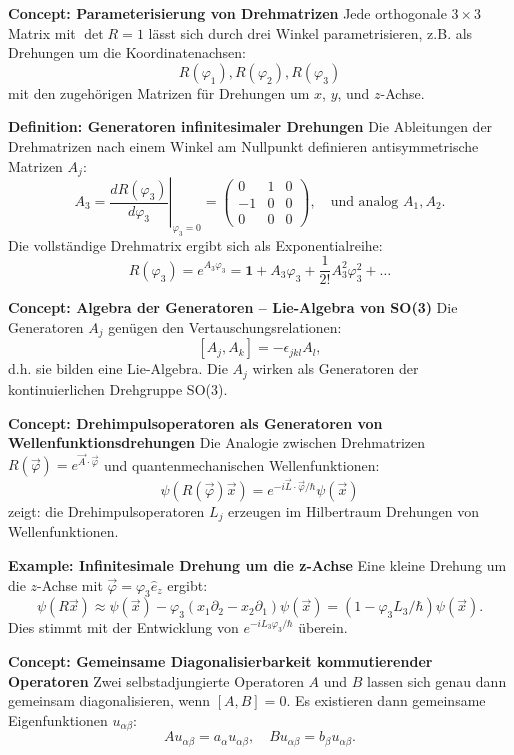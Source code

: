 \documentclass[10pt, letterpaper]{article}
\begin{document}
\textbf{Concept: Parameterisierung von Drehmatrizen}  
Jede orthogonale $3\times3$ Matrix mit $\det R = 1$ lässt sich durch drei Winkel parametrisieren, z.B. als Drehungen um die Koordinatenachsen:
$$
R(\varphi_1), R(\varphi_2), R(\varphi_3)
$$
mit den zugehörigen Matrizen für Drehungen um $x$, $y$, und $z$-Achse.



\textbf{Definition: Generatoren infinitesimaler Drehungen}  
Die Ableitungen der Drehmatrizen nach einem Winkel am Nullpunkt definieren antisymmetrische Matrizen $A_j$:
$$
A_3 = \left.\frac{dR(\varphi_3)}{d\varphi_3}\right|_{\varphi_3=0} =
\begin{pmatrix}
0 & 1 & 0 \\
-1 & 0 & 0 \\
0 & 0 & 0
\end{pmatrix}, \quad \text{und analog } A_1, A_2.
$$
Die vollständige Drehmatrix ergibt sich als Exponentialreihe:
$$
R(\varphi_3) = e^{A_3 \varphi_3} = \mathbf{1} + A_3 \varphi_3 + \frac{1}{2!} A_3^2 \varphi_3^2 + \dots
$$



\textbf{Concept: Algebra der Generatoren – Lie-Algebra von SO(3)}  
Die Generatoren $A_j$ genügen den Vertauschungsrelationen:
$$
[A_j, A_k] = -\epsilon_{jkl} A_l,
$$
d.h. sie bilden eine Lie-Algebra. Die $A_j$ wirken als Generatoren der kontinuierlichen Drehgruppe SO(3).


\textbf{Concept: Drehimpulsoperatoren als Generatoren von Wellenfunktionsdrehungen}  
Die Analogie zwischen Drehmatrizen $R(\vec{\varphi}) = e^{\vec{A} \cdot \vec{\varphi}}$ und quantenmechanischen Wellenfunktionen:
$$
\psi(R(\vec{\varphi}) \vec{x}) = e^{-i \vec{L} \cdot \vec{\varphi} / \hbar} \psi(\vec{x})
$$
zeigt: die Drehimpulsoperatoren $L_j$ erzeugen im Hilbertraum Drehungen von Wellenfunktionen.



\textbf{Example: Infinitesimale Drehung um die z-Achse}  
Eine kleine Drehung um die $z$-Achse mit $\vec{\varphi} = \varphi_3 \hat{e}_z$ ergibt:
$$
\psi(R \vec{x}) \approx \psi(\vec{x}) - \varphi_3 (x_1 \partial_2 - x_2 \partial_1) \psi(\vec{x}) = (1 - \varphi_3 L_3/\hbar) \psi(\vec{x}).
$$
Dies stimmt mit der Entwicklung von $e^{-i L_3 \varphi_3 / \hbar}$ überein.



\textbf{Concept: Gemeinsame Diagonalisierbarkeit kommutierender Operatoren}  
Zwei selbstadjungierte Operatoren $A$ und $B$ lassen sich genau dann gemeinsam diagonalisieren, wenn $[A, B] = 0$. Es existieren dann gemeinsame Eigenfunktionen $u_{\alpha \beta}$:
$$
A u_{\alpha \beta} = a_\alpha u_{\alpha \beta}, \quad B u_{\alpha \beta} = b_\beta u_{\alpha \beta}.
$$
\end{document}
